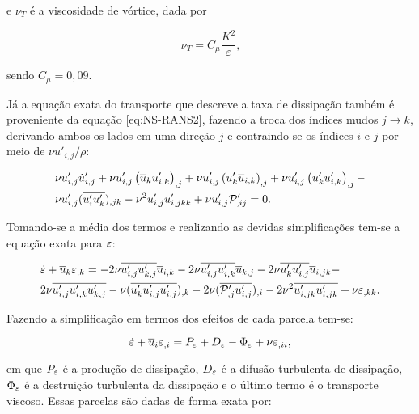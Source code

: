 \noindent e $\nu_T$ é a viscosidade de vórtice, dada por

\begin{equation}
    \nu_T=C_\mu\frac{K^2}{\varepsilon}\text{,}
\end{equation}

\noindent sendo $C_\mu=0,09$.

Já a equação exata do transporte que descreve a taxa de dissipação também é proveniente da equação \eqref{eq:NS-RANS2}, fazendo a troca dos índices mudos $j\to k$, derivando ambos os lados em uma direção $j$ e contraindo-se os índices $i$ e $j$ por meio de $\nu u'_{i,j}/\rho$:

\begin{equation}
    \begin{split}
        &\nu u'_{i,j}\dot{u}'_{i,j}+\nu u'_{i,j}\left({\overline{u}_ku'_{i,k}}\right)_{,j}+\nu u'_{i,j}\left({u'_k\overline{u}_{i,k}}\right)_{,j}+\nu u'_{i,j}\left({u'_ku'_{i,k}}\right)_{,j}-\\
        &\nu u'_{i,j}(\overline{u'_iu'_k})_{,jk}-\nu^2u'_{i,j}u'_{i,jkk}+\nu u'_{i,j}\mathcal{P}'_{,ij}=0\text{.}
    \end{split}
\end{equation}

Tomando-se a média dos termos e realizando as devidas simplificações tem-se a equação exata para $\varepsilon$:

\begin{equation}
    \begin{split}
        &\dot{\varepsilon}+\overline{u}_k\varepsilon_{,k}=-2\nu\overline{u'_{i,j}u'_{k,j}}\overline{u}_{i,k}-2\nu\overline{u'_{i,j}u'_{i,k}}\overline{u}_{k,j}-2\nu\overline{u'_ku'_{i,j}}\overline{u}_{i,jk}-\\
        &2\nu\overline{u'_{i,j}u'_{i,k}u'_{k,j}}-\nu(\overline{u'_ku'_{i,j}u'_{i,j}})_{,k}-2\nu(\overline{\mathcal{P}'_{,j}u'_{i,j}})_{,i}-2\nu^2\overline{u'_{i,jk}u'_{i,jk}}+\nu\varepsilon_{,kk}\text{.}
    \end{split}
\end{equation}

Fazendo a simplificação em termos dos efeitos de cada parcela tem-se:

\begin{equation}
    \dot{\varepsilon}+\overline{u}_i\varepsilon_{,i}=P_\varepsilon+D_\varepsilon-\Phi_\varepsilon+\nu\varepsilon_{,ii}\text{,}
\end{equation}

\noindent em que $P_\varepsilon$ é a produção de dissipação, $D_\varepsilon$ é a difusão turbulenta de dissipação, $\Phi_\varepsilon$ é a destruição turbulenta da dissipação e o último termo é o transporte viscoso. Essas parcelas são dadas de forma exata por:

